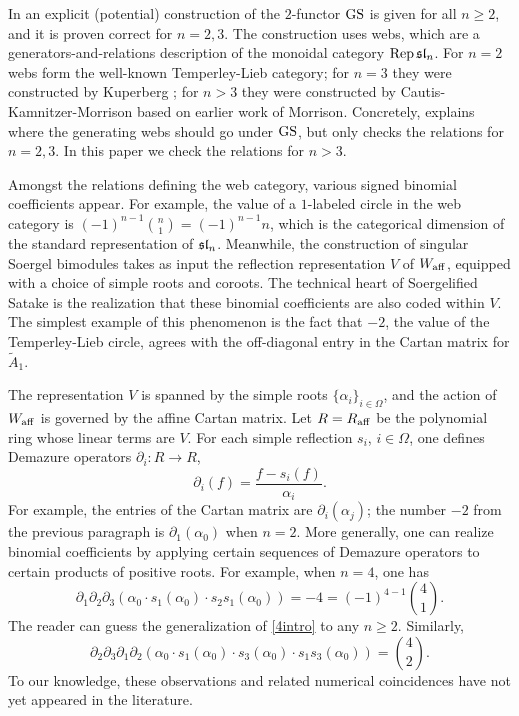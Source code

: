 In \cite{EQuantumI} an explicit (potential) construction of the $2$-functor $\operatorname{GS}$ is given for all $n \ge 2$, and it is proven correct for $n=2, 3$. The construction uses webs, which are a generators-and-relations description of the monoidal category $\operatorname{Rep} \mathfrak{sl}_n$. For $n=2$ webs form the well-known Temperley-Lieb category; for $n=3$ they were constructed by Kuperberg \cite{Kupe}; for $n>3$ they were constructed by Cautis-Kamnitzer-Morrison \cite{CKM} based on earlier work of Morrison. Concretely, \cite{EQuantumI} explains where the generating webs should go under $\operatorname{GS}$, but only checks the relations for $n=2,3$. In this paper we check the relations for $n > 3$.

Amongst the relations defining the web category, various signed binomial coefficients appear. For example, the value of a $1$-labeled circle in the web category is $(-1)^{n-1} \binom{n}{1} = (-1)^{n-1} n$, which is the categorical dimension of the standard representation of $\mathfrak{sl}_n$. Meanwhile, the construction of singular Soergel bimodules takes as input the reflection representation $V$ of $W_{\operatorname{aff}}$, equipped with a choice of simple roots and coroots. 
The technical heart of Soergelified Satake is the realization that these binomial coefficients are also coded within $V$. The simplest example of this phenomenon is the fact that $-2$, the value of the Temperley-Lieb circle, agrees with the off-diagonal entry in the Cartan matrix for $\tilde{A}_1$.

The representation $V$ is spanned by the simple roots $\{\alpha_i\}_{i \in \Omega}$, and the action of $W_{\operatorname{aff}}$ is governed by the affine Cartan matrix. Let $R = R_{\operatorname{aff}}$ be the polynomial ring whose linear terms are $V$. For each simple reflection $s_i$, $i \in \Omega$, one defines Demazure operators $\partial_i \colon R \to R$,
\begin{equation} \partial_i(f) = \frac{f - s_i(f)}{\alpha_i}. \end{equation}
For example, the entries of the Cartan matrix are $\partial_i(\alpha_j)$; the number $-2$ from the previous paragraph is $\partial_1(\alpha_0)$ when $n=2$. More generally, one can realize binomial coefficients by applying certain sequences of Demazure operators to certain products of positive roots. For example, when $n=4$, one has
\begin{equation} \label{4intro} \partial_1 \partial_2 \partial_3 \left(\alpha_0 \cdot s_1(\alpha_0) \cdot s_2 s_1(\alpha_0) \right) = -4 = (-1)^{4-1} \binom{4}{1}. \end{equation}
The reader can guess the generalization of \eqref{4intro} to any $n \ge 2$. Similarly, 
\begin{equation} \label{42intro} \partial_2 \partial_3 \partial_1 \partial_2(\alpha_0 \cdot s_1(\alpha_0) \cdot s_3(\alpha_0) \cdot s_1 s_3(\alpha_0)) = \binom{4}{2}.
\end{equation}
To our knowledge, these observations and related numerical coincidences have not yet appeared in the literature.

